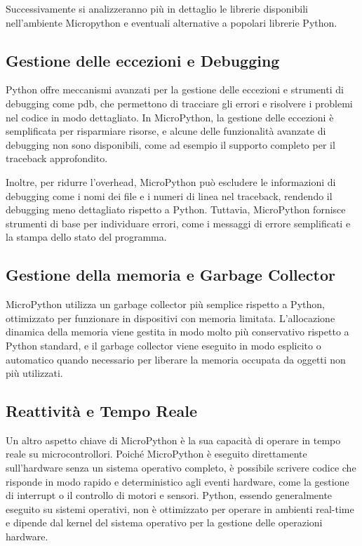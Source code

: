 \documentclass[12pt,a4paper]{report}
\begin{document}
Successivamente si analizzeranno più in dettaglio le librerie disponibili nell'ambiente Micropython e eventuali alternative a popolari librerie Python.

\subsection{Gestione delle eccezioni e Debugging}

Python offre meccanismi avanzati per la gestione delle eccezioni e strumenti di debugging come pdb, che permettono di tracciare gli errori e risolvere i problemi nel codice in modo dettagliato. In MicroPython, la gestione delle eccezioni è semplificata per risparmiare risorse, e alcune delle funzionalità avanzate di debugging non sono disponibili, come ad esempio il supporto completo per il traceback approfondito.

Inoltre, per ridurre l'overhead, MicroPython può escludere le informazioni di debugging come i nomi dei file e i numeri di linea nel traceback, rendendo il debugging meno dettagliato rispetto a Python. Tuttavia, MicroPython fornisce strumenti di base per individuare errori, come i messaggi di errore semplificati e la stampa dello stato del programma.

\subsection{Gestione della memoria e Garbage Collector}

MicroPython utilizza un garbage collector più semplice rispetto a Python, ottimizzato per funzionare in dispositivi con memoria limitata. L'allocazione dinamica della memoria viene gestita in modo molto più conservativo rispetto a Python standard, e il garbage collector viene eseguito in modo esplicito o automatico quando necessario per liberare la memoria occupata da oggetti non più utilizzati.

\subsection{Reattività e Tempo Reale}

Un altro aspetto chiave di MicroPython è la sua capacità di operare in tempo reale su microcontrollori. Poiché MicroPython è eseguito direttamente sull'hardware senza un sistema operativo completo, è possibile scrivere codice che risponde in modo rapido e deterministico agli eventi hardware, come la gestione di interrupt o il controllo di motori e sensori. Python, essendo generalmente eseguito su sistemi operativi, non è ottimizzato per operare in ambienti real-time e dipende dal kernel del sistema operativo per la gestione delle operazioni hardware.
\end{document}
